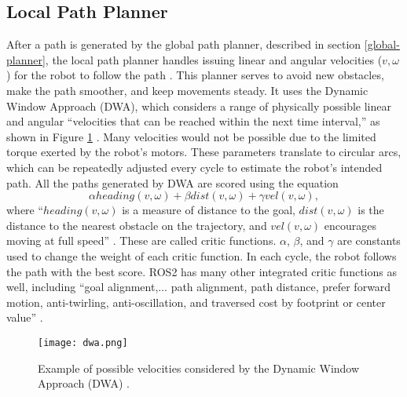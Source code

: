 \subsection{Local Path Planner} \label{local-planner}
After a path is generated by the global path planner, described in section \ref{global-planner}, the local path planner handles issuing linear and angular velocities ($v,\omega$) for the robot to follow the path \parencite{macenskiDesksROSMaintainers2023}. This planner serves to avoid new obstacles, make the path smoother, and keep movements steady. It uses the Dynamic Window Approach (DWA), which considers a range of physically possible linear and angular ``velocities that can be reached within the next time interval,'' as shown in Figure \ref{fig:dwa} \parencite{robotmaniaDynamicWindowApproach2020}. Many velocities would not be possible due to the limited torque exerted by the robot's motors. These parameters translate to circular arcs, which can be repeatedly adjusted every cycle to estimate the robot's intended path. All the paths generated by DWA are scored using the equation
\[
    \alpha heading(v,\omega) + \beta dist(v,\omega) + \gamma vel(v,\omega),
\]
where ``$heading(v,\omega)$ is a measure of distance to the goal, $dist(v,\omega)$ is the distance to the nearest obstacle on the trajectory, and $vel(v,\omega)$ encourages moving at full speed'' \parencite{macenskiDesksROSMaintainers2023}. These are called critic functions. $\alpha$, $\beta$, and $\gamma$ are constants used to change the weight of each critic function. In each cycle, the robot follows the path with the best score. ROS2 has many other integrated critic functions as well, including ``goal alignment,... path alignment, path distance, prefer forward motion, anti-twirling, anti-oscillation, and traversed cost by footprint or center value'' \parencite{macenskiDesksROSMaintainers2023}.

\begin{figure}[!htb]
    \texttt{[image: dwa.png]}
    \centering
    \caption{Example of possible velocities considered by the Dynamic Window Approach (DWA) \parencite{robotmaniaDynamicWindowApproach2020}.}
    \label{fig:dwa}
\end{figure}
